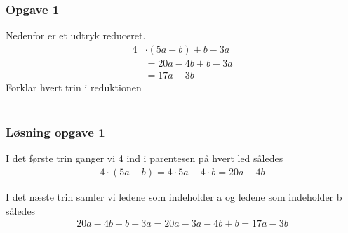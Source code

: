 \subsubsection{Opgave 1}

Nedenfor er et udtryk reduceret.\\
\begin{align*}
    4&\cdot (5a-b)+b-3a\\
    &=20a-4b+b-3a\\
    &=17a-3b
\end{align*}
Forklar hvert trin i reduktionen\\\\

\subsubsection*{Løsning opgave 1}
I det første trin ganger vi 4 ind i parentesen på hvert led således
\begin{align*}
    4\cdot (5a-b)=4\cdot 5a - 4\cdot b=20a-4b
\end{align*}

I det næste trin samler vi ledene som indeholder a og ledene som indeholder b således
\begin{align*}
    20a -4b + b - 3a = 20a - 3a - 4b + b = 17a - 3b
\end{align*}
